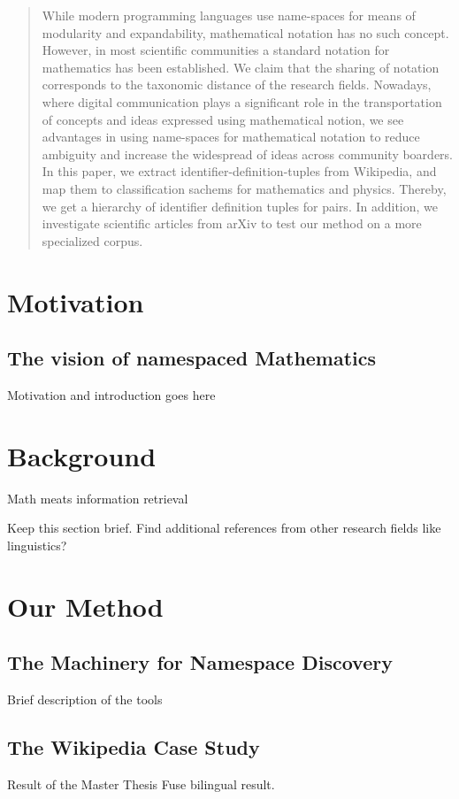 \documentclass{sig-alternate-2013}
\begin{document}
\begin{abstract}
While modern programming languages use name-spaces for means of modularity and expandability, mathematical notation has no such concept.
However, in most scientific communities a standard notation for mathematics has been established.
We claim that the sharing of notation corresponds to the taxonomic distance of the research fields.
Nowadays, where digital communication plays a significant role in the transportation of concepts and ideas expressed using mathematical notion, we see advantages in using name-spaces for mathematical notation to reduce ambiguity and increase the widespread of ideas across community boarders.
In this paper, we extract identifier-definition-tuples from Wikipedia, and map them to classification sachems for mathematics and physics. Thereby, we get a hierarchy of identifier definition tuples for pairs.
In addition, we investigate scientific articles from arXiv to test our method on a more specialized corpus.
\end{abstract}







\section{Motivation}
\subsection{The vision of namespaced Mathematics}
Motivation and introduction goes here

\section{Background}
Math meats information retrieval

Keep this section brief. Find additional references from other research fields like linguistics?

\section{Our Method}
\subsection{The Machinery for Namespace Discovery}
Brief description of the tools
\subsection{The Wikipedia Case Study}
Result of the Master Thesis
Fuse bilingual result.
\end{document}

